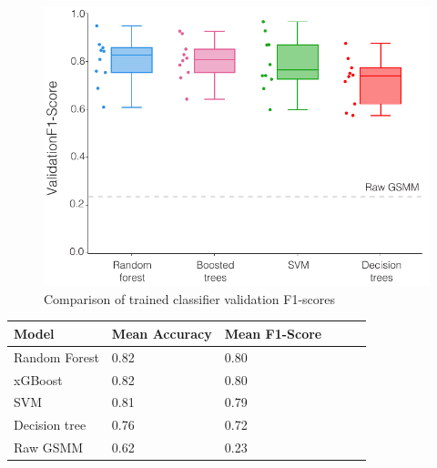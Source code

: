 \documentclass[11pt,a4paper]{article}
\begin{document}
\begin{figure}[tbp]
    \includegraphics[width=\textwidth]{figures/FIG_model_selection/FIG_model_selection.pdf}
    \caption{Comparison of trained classifier validation F1-scores}
    \label{fig:FIG_model_selection}
\end{figure}

\begin{center}
    \begin{tabular}{ | l | l | l | l | l | p{5cm} |}
    \hline
    \textbf{Model} & \textbf{Mean Accuracy} & \textbf{Mean F1-Score} \\ \hline \hline
    Random Forest & 0.82 & 0.80 \\ \hline
    xGBoost & 0.82 & 0.80 \\ \hline
    SVM & 0.81 & 0.79 \\ \hline
    Decision tree & 0.76 & 0.72 \\ \hline
    Raw GSMM & 0.62 & 0.23 \\ \hline
    \end{tabular}
    \label{tab:TAB_model_performance}
\end{center}
\end{document}
